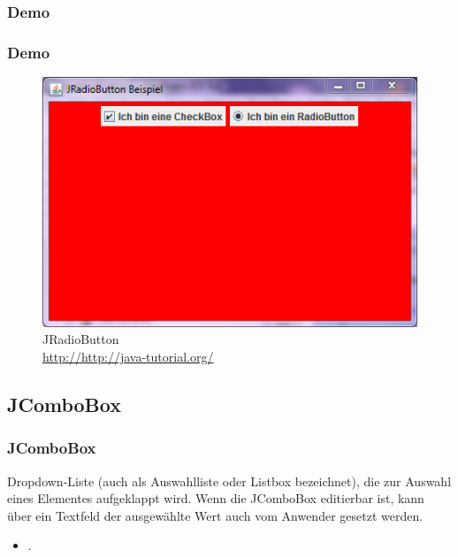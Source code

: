 \documentclass[xcolor=dvipsnames]{beamer}
\begin{document}
\subsubsection{Demo}
\begin{frame}
  \frametitle{Demo}
	\begin{figure}
		\includegraphics[scale=0.8]{images/jradiobutton.PNG}
		\caption{JRadioButton \\ \tiny{\textcolor{gray}{\url{http://http://java-tutorial.org/}}}}
		\end{figure}
\end{frame}


\subsection{JComboBox}
\begin{frame} %
  \frametitle{JComboBox} %
  \begin{block}{Dropdown-Liste (auch als Auswahlliste oder Listbox bezeichnet), die zur Auswahl eines Elementes aufgeklappt wird. Wenn die JComboBox editierbar ist, kann über ein Textfeld der ausgewählte Wert auch vom Anwender gesetzt werden.}
	  \begin{itemize}
		\item .
	  \end{itemize}
  \end{block}
\end{frame}
\end{document}
